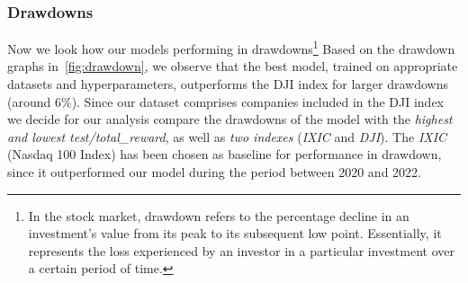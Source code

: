 \documentclass[../xlapes02]{subfiles}
\begin{document}
    \subsubsection{Drawdowns}
    Now we look how our models performing in drawdowns\footnote{In the stock market, drawdown refers to the percentage decline in an investment's value from its peak to its subsequent low point. Essentially, it represents the loss experienced by an investor in a particular investment over a certain period of time.} Based on the drawdown graphs in~\cref{fig:drawdown}, we observe that the best model, trained on appropriate datasets and hyperparameters, outperforms the DJI index for larger drawdowns (around $6\%$). Since our dataset comprises companies included in the DJI index we decide for our analysis compare the drawdowns of the model with the \emph{highest and lowest test/total\_reward}, as well as \emph{two indexes} (\emph{IXIC} and \emph{DJI}). The \emph{IXIC} (Nasdaq 100 Index) has been chosen as baseline for performance in drawdown, since it outperformed our model during the period between 2020 and 2022.
\end{document}
